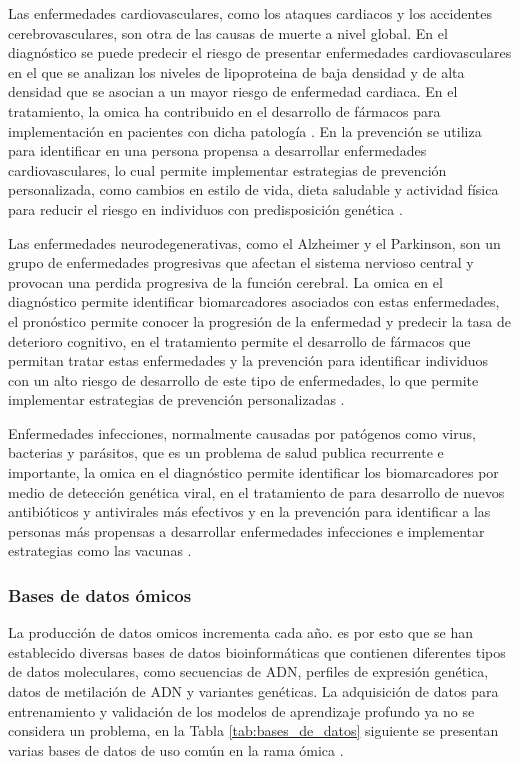 Las enfermedades cardiovasculares, como los ataques cardiacos y los accidentes cerebrovasculares, son otra de las causas de muerte a nivel global. En el diagnóstico se puede predecir el riesgo de presentar enfermedades cardiovasculares en el que se analizan los niveles de lipoproteina de baja densidad y de alta densidad que se asocian a un mayor riesgo de enfermedad cardiaca. En el tratamiento, la omica ha contribuido en el desarrollo de fármacos para implementación en pacientes con dicha patología \citep{pasha2020cardiovascular}. En la prevención se utiliza para identificar en una persona propensa a desarrollar enfermedades cardiovasculares, lo cual permite implementar estrategias de prevención personalizada, como cambios en estilo de vida, dieta saludable y actividad física para reducir el riesgo en individuos con predisposición genética \citep{wang2017detecting}.

Las enfermedades neurodegenerativas, como el Alzheimer y el Parkinson, son un grupo de enfermedades progresivas que afectan el sistema nervioso central y provocan una perdida progresiva de la función cerebral. La omica en el diagnóstico permite identificar biomarcadores asociados con estas enfermedades, el pronóstico permite conocer la progresión de la enfermedad y predecir la tasa de deterioro cognitivo, en el tratamiento permite el desarrollo de fármacos que permitan tratar estas enfermedades y la prevención para identificar individuos con un alto riesgo de desarrollo de este tipo de enfermedades, lo que permite implementar estrategias de prevención personalizadas \citep{erdacs2021neurodegenerative}.

Enfermedades infecciones, normalmente causadas por patógenos como virus, bacterias y parásitos, que es un problema de salud publica recurrente e importante, la omica en el diagnóstico permite identificar los biomarcadores por medio de detección genética viral, en el tratamiento de para desarrollo de nuevos antibióticos y antivirales más efectivos y en la prevención para identificar a las personas más propensas a desarrollar enfermedades infecciones e implementar estrategias como las vacunas \citep{chae2018predicting}.



\subsubsection{Bases de datos ómicos}

La producción de datos omicos incrementa cada año. es por esto que se han establecido diversas bases de datos bioinformáticas que contienen diferentes tipos de datos moleculares, como secuencias de ADN, perfiles de expresión genética, datos de metilación de ADN y variantes genéticas. La adquisición de datos para entrenamiento y validación de los modelos de aprendizaje profundo ya no se considera un problema, en la Tabla \ref{tab:bases_de_datos} siguiente se presentan varias bases de datos de uso común en la rama ómica \citep{zhang2019deep}.

